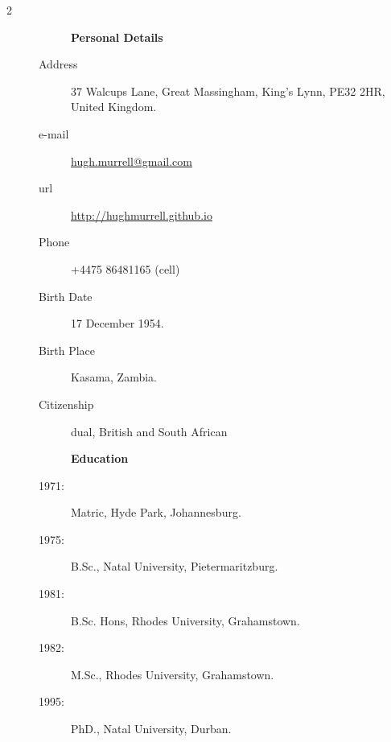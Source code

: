 \documentclass[12pt]{article}
\begin{document}
\begin{multicols}{2}
\begin{description}\item[] \begin{description}\item[] {\large \bf   Personal Details  }
\item[Address]  37 Walcups Lane, Great Massingham, King's Lynn, PE32 2HR, United Kingdom.
\item[e-mail]  \url{hugh.murrell@gmail.com}
\item[url]  \url{http://hughmurrell.github.io}
\item[Phone]  +4475 86481165 (cell) 
\item[Birth Date]  17 December 1954.
\item[Birth Place]  Kasama, Zambia.
\item[Citizenship]  dual, British and South African
\end{description}
\end{description}

\begin{description}\item[] \begin{description}\item[] {\large \bf   Education  }    
\item[1971:] Matric, Hyde Park, Johannesburg.
  \item[1975:]  B.Sc., Natal University, Pietermaritzburg. 
  \item[1981:]  B.Sc. Hons, Rhodes University, Grahamstown. 
  \item[1982: ] M.Sc., Rhodes University, Grahamstown. 
  \item[1995: ] PhD., Natal University, Durban. 
 \end{description}
 \end{description}
 

\end{multicols}
\end{document}
